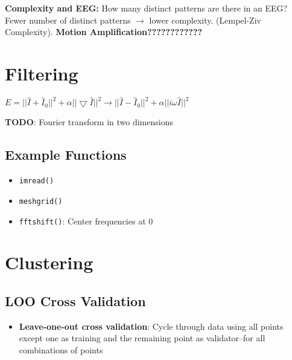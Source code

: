 \documentclass{article}
\begin{document}
        \textbf{Complexity and EEG:} How many distinct patterns are there in an 
EEG?
        Fewer number of distinct patterns \ensuremath{\rightarrow} lower 
complexity.
        (Lempel-Ziv Complexity).
        \textbf{Motion Amplification????????????}
    \section{Filtering}
        \begin{math}
            E = ||\hat{I} + \hat{I}_0||^2 +\alpha||\bigtriangledown\hat{I}||^2 
            \rightarrow ||\hat{I} - \hat{I}_0||^2 +\alpha||i\omega\hat{I}||^2
        \end{math}

        \textbf{TODO}: Fourier transform in two dimensions 
        \subsection{Example Functions}
        \begin{itemize}
        \item \texttt{imread()}
        \item \texttt{meshgrid()}
        \item \texttt{fftshift()}: Center frequencies at 0
         
        \end{itemize} 
        
    \section{Clustering}
        \subsection{LOO Cross Validation}
        \begin{itemize}
        \item \textbf{Leave-one-out cross validation}: Cycle through data using all
points except one as training and the remaining point as validator--for all
combinations of points

        \end{itemize}
\end{document}
